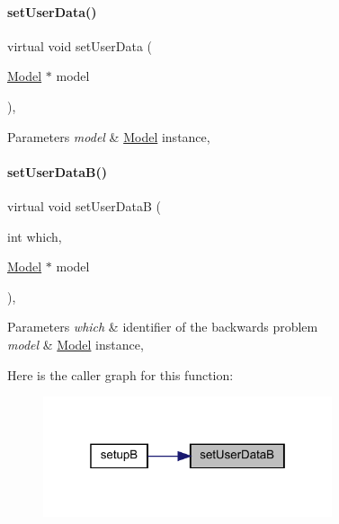 \paragraph{\texorpdfstring{setUserData()}{setUserData()}}
{\footnotesize\ttfamily virtual void set\+User\+Data (\begin{DoxyParamCaption}\item[{\mbox{\hyperlink{classamici_1_1_model}{Model}} $\ast$}]{model }\end{DoxyParamCaption})\hspace{0.3cm}{\ttfamily [protected]}, {}}


\begin{DoxyParams}{Parameters}
{\em model} & \mbox{\hyperlink{classamici_1_1_model}{Model}} instance, \\
\hline
\end{DoxyParams}
\mbox{\label{classamici_1_1_solver_ac5c347a985fa73861a88e76c7b9904f8}} 
\paragraph{\texorpdfstring{setUserDataB()}{setUserDataB()}}
{\footnotesize\ttfamily virtual void set\+User\+DataB (\begin{DoxyParamCaption}\item[{int}]{which,  }\item[{\mbox{\hyperlink{classamici_1_1_model}{Model}} $\ast$}]{model }\end{DoxyParamCaption})\hspace{0.3cm}{\ttfamily [protected]}, {}}


\begin{DoxyParams}{Parameters}
{\em which} & identifier of the backwards problem \\
\hline
{\em model} & \mbox{\hyperlink{classamici_1_1_model}{Model}} instance, \\
\hline
\end{DoxyParams}
Here is the caller graph for this function\+:
\nopagebreak
\begin{figure}[H]
\begin{center}
\leavevmode
\includegraphics[width=241pt]{classamici_1_1_solver_ac5c347a985fa73861a88e76c7b9904f8_icgraph}
\end{center}
\end{figure}
\mbox{\label{classamici_1_1_solver_a29f208ce304b01c8fe294ab9143a98e5}} 
